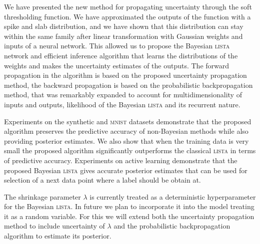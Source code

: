 \documentclass{article}
\begin{document}
We have presented the new method for propagating uncertainty through the soft thresholding function. %
We have approximated the outputs of the function with a spike and slab distribution, and we have shown that this distribution can stay within the same family after linear transformation with Gaussian weights and inputs of a neural network. This allowed us to propose the Bayesian \textsc{lista} network and efficient inference algorithm that learns the distributions of the weights and makes the uncertainty estimates of the outputs. The forward propagation in the algorithm is based on the proposed uncertainty propagation method, the backward propagation is based on the probabilistic backpropagation method, that was remarkably expanded to account for multidimensionality of inputs and outputs, likelihood of the Bayesian \textsc{lista} and its recurrent nature.

Experiments on the synthetic and \textsc{mnist} datasets demonstrate that the proposed algorithm preserves the predictive accuracy of non-Bayesian methods while also providing posterior estimates. We also show that when the training data is very small the proposed algorithm significantly outperforms the classical \textsc{lista} in terms of predictive accuracy. Experiments on active learning demonstrate that the proposed Bayesian \textsc{lista} gives accurate posterior estimates that can be used for selection of a next data point where a label should be obtain at.

The shrinkage parameter $\lambda$ is currently treated as a deterministic hyperparameter for the Bayesian \textsc{lista}. In future we plan to incorporate it into the model treating it as a random variable. For this we will extend both the uncertainty propagation method to include uncertainty of $\lambda$ and the probabilistic backpropagation algorithm to estimate its posterior.

\small


\end{document}

